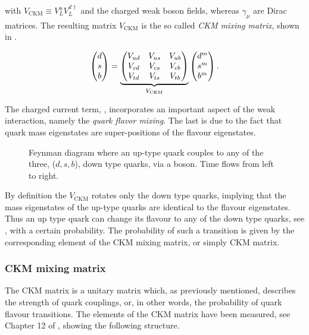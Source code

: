 \noindent with $V_{\text{CKM}} \equiv V^u_LV^{d\dagger}_L$ and \Wpm the charged weak boson fields, whereas $\gamma_\mu$ are Dirac matrices.
The resulting matrix $V_{\text{CKM}}$ is the so called {\it CKM mixing matrix}, shown in .

\begin{equation}
  \centering
  \begin{pmatrix} \dquark \\ \squark \\ \bquark  \end{pmatrix} =
  \underbrace{\begin{pmatrix} \Vud & \Vus & \Vub \\ \Vcd & \Vcs & \Vcb \\ \Vtd & \Vts & \Vtb \end{pmatrix}}_{V_{\text{CKM}}}
    \begin{pmatrix} \dquark^m \\ \squark^m \\ \bquark^m  \end{pmatrix}.
      \label{quark_field_rotation}
  \end{equation}

The charged current term, , incorporates an important aspect of the weak interaction,
namely the {\it quark flavor mixing}. The last is due to the fact that quark mass eigenstates are super-positions
of the flavour eigenstates.

\begin{figure}[h!]
  \centering
  {\sffamily }
  \caption{Feynman diagram where an up-type quark couples to any of the three, ($d,s,b$), down type quarks,
           via a \Wp boson. Time flows from left to right.}
  \label{QuarkMixing}
\end{figure}

\noindent By definition the $V_{\text{CKM}}$ rotates only the down type quarks, implying that
the mass eigenstates of the up-type quarks are identical to the flavour eigenstates. Thus an up type quark
can change its flavour to any of the down type quarks, see , with a certain probability.
The probability of such a transition is given by the corresponding element of the CKM mixing matrix, or simply CKM matrix.

\subsubsection{CKM mixing matrix}
The CKM matrix is a unitary matrix which, as previously mentioned, describes the strength of quark couplings,
or, in other words, the probability of quark flavour transitions. The elements of the CKM matrix have been measured, see \eg Chapter 12 of \cite{PDG},
showing the following structure.

